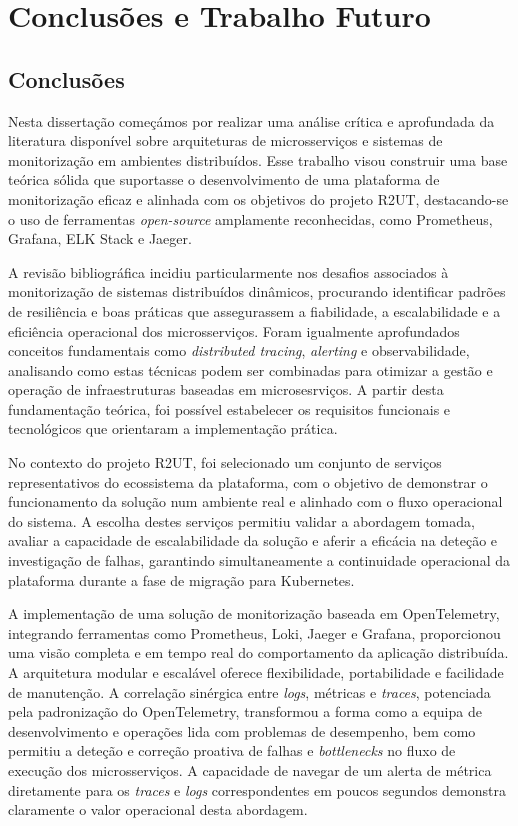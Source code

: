 \chapter{Conclusões e Trabalho Futuro}

\section{Conclusões}

Nesta dissertação começámos por realizar uma análise crítica e aprofundada da literatura disponível sobre arquiteturas de microsserviços e sistemas de monitorização em ambientes distribuídos. Esse trabalho visou construir uma base teórica sólida que suportasse o desenvolvimento de uma plataforma de monitorização eficaz e alinhada com os objetivos do projeto R2UT, destacando-se o uso de ferramentas \textit{open-source} amplamente reconhecidas, como Prometheus, Grafana, ELK Stack e Jaeger.

A revisão bibliográfica incidiu particularmente nos desafios associados à monitorização de sistemas distribuídos dinâmicos, procurando identificar padrões de resiliência e boas práticas que assegurassem a fiabilidade, a escalabilidade e a eficiência operacional dos microsserviços. Foram igualmente aprofundados conceitos fundamentais como \textit{distributed tracing}, \textit{alerting} e observabilidade, analisando como estas técnicas podem ser combinadas para otimizar a gestão e operação de infraestruturas baseadas em microsesrviços. A partir desta fundamentação teórica, foi possível estabelecer os requisitos funcionais e tecnológicos que orientaram a implementação prática.

No contexto do projeto R2UT, foi selecionado um conjunto de serviços representativos do ecossistema da plataforma, com o objetivo de demonstrar o funcionamento da solução num ambiente real e alinhado com o fluxo operacional do sistema. A escolha destes serviços permitiu validar a abordagem tomada, avaliar a capacidade de escalabilidade da solução e aferir a eficácia na deteção e investigação de falhas, garantindo simultaneamente a continuidade operacional da plataforma durante a fase de migração para Kubernetes.

A implementação de uma solução de monitorização baseada em OpenTelemetry, integrando ferramentas como Prometheus, Loki, Jaeger e Grafana, proporcionou uma visão completa e em tempo real do comportamento da aplicação distribuída. A arquitetura modular e escalável oferece flexibilidade, portabilidade e facilidade de manutenção. A correlação sinérgica entre \textit{logs}, métricas e \textit{traces}, potenciada pela padronização do OpenTelemetry, transformou a forma como a equipa de desenvolvimento e operações lida com problemas de desempenho, bem como permitiu a deteção e correção proativa de falhas e \textit{bottlenecks} no fluxo de execução dos microsserviços. A capacidade de navegar de um alerta de métrica diretamente para os \textit{traces} e \textit{logs} correspondentes em poucos segundos demonstra claramente o valor operacional desta abordagem.

